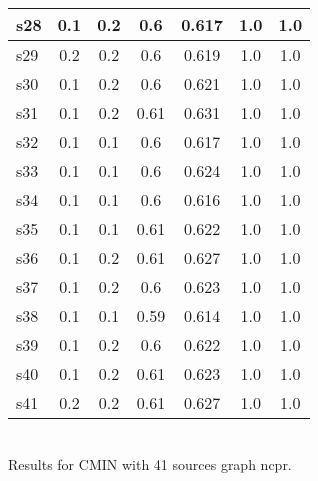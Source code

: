 \documentclass{article}
\begin{document}
\begin{tabular}{|l|c|c|c|c|c|c|}
\hline
s28 &0.1 & 0.2 & 0.6 & 0.617 & 1.0 & 1.0\\
\hline
s29 &0.2 & 0.2 & 0.6 & 0.619 & 1.0 & 1.0\\
\hline
s30 &0.1 & 0.2 & 0.6 & 0.621 & 1.0 & 1.0\\
\hline
s31 &0.1 & 0.2 & 0.61 & 0.631 & 1.0 & 1.0\\
\hline
s32 &0.1 & 0.1 & 0.6 & 0.617 & 1.0 & 1.0\\
\hline
s33 &0.1 & 0.1 & 0.6 & 0.624 & 1.0 & 1.0\\
\hline
s34 &0.1 & 0.1 & 0.6 & 0.616 & 1.0 & 1.0\\
\hline
s35 &0.1 & 0.1 & 0.61 & 0.622 & 1.0 & 1.0\\
\hline
s36 &0.1 & 0.2 & 0.61 & 0.627 & 1.0 & 1.0\\
\hline
s37 &0.1 & 0.2 & 0.6 & 0.623 & 1.0 & 1.0\\
\hline
s38 &0.1 & 0.1 & 0.59 & 0.614 & 1.0 & 1.0\\
\hline
s39 &0.1 & 0.2 & 0.6 & 0.622 & 1.0 & 1.0\\
\hline
s40 &0.1 & 0.2 & 0.61 & 0.623 & 1.0 & 1.0\\
\hline
s41 &0.2 & 0.2 & 0.61 & 0.627 & 1.0 & 1.0\\
\hline
\end{tabular}\\

\noindent Results for CMIN with 41 sources graph ncpr.
\end{document}
